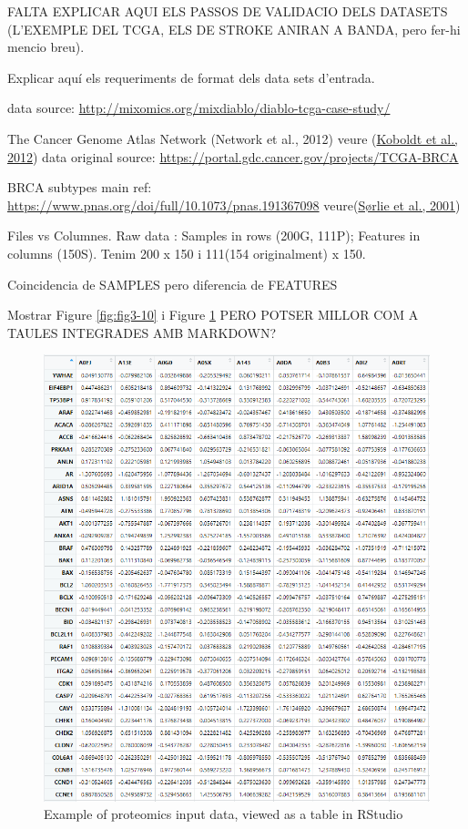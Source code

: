\documentclass[a4paper, nobind]{templates/ociamthesis}
\begin{document}
\bigskip

FALTA EXPLICAR AQUI ELS PASSOS DE VALIDACIO DELS DATASETS (L'EXEMPLE DEL TCGA, ELS DE STROKE ANIRAN A BANDA, pero fer-hi mencio breu).

Explicar aquí els requeriments de format dels data sets d'entrada.

data source: \url{http://mixomics.org/mixdiablo/diablo-tcga-case-study/}

The Cancer Genome Atlas Network (Network et al., 2012)
veure (\protect\hyperlink{ref-koboldt_comprehensive_2012}{Koboldt et al., 2012})
data original source: \url{https://portal.gdc.cancer.gov/projects/TCGA-BRCA}

BRCA subtypes main ref: \url{https://www.pnas.org/doi/full/10.1073/pnas.191367098}
veure(\protect\hyperlink{ref-sorlie_gene_2001}{Sørlie et al., 2001})

Files vs Columnes. Raw data : Samples in rows (200G, 111P); Features in columns (150S). Tenim 200 x 150 i 111(154 originalment) x 150.

Coincidencia de SAMPLES pero diferencia de FEATURES

Mostrar Figure \ref{fig:fig3-10} i Figure \ref{fig:fig3-9} PERO POTSER MILLOR COM A TAULES INTEGRADES AMB MARKDOWN?

\clearpage

\begin{figure}

{\centering \includegraphics[width=0.95\linewidth]{figures/chapter3/3-9_protein_data_example} 

}

\caption[Example of proteomics input data]{Example of proteomics input data, viewed as a table in RStudio}\label{fig:fig3-9}
\end{figure}
\end{document}
